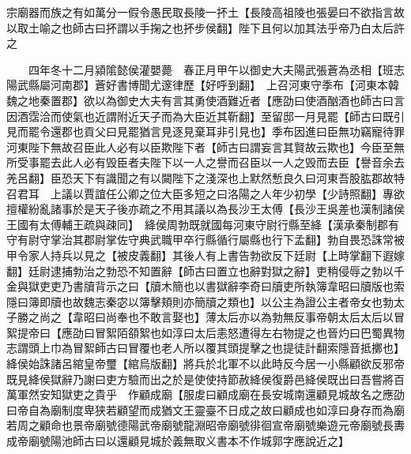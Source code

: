 宗廟器而族之有如萬分一假令愚民取長陵一抔土【長陵高祖陵也張晏曰不欲指言故以取土喻之也師古曰抔謂以手掬之也抔步侯翻】陛下且何以加其法乎帝乃白太后許之

　　四年冬十二月潁隂懿侯灌嬰薨　春正月甲午以御史大夫陽武張蒼為丞相【班志陽武縣屬河南郡】蒼好書博聞尤邃律歷【好呼到翻】　上召河東守季布【河東本韓魏之地秦置郡】欲以為御史大夫有言其勇使酒難近者【應劭曰使酒酗酒也師古曰言因酒霑洽而使氣也近謂附近天子而為大臣近其靳翻】至留邸一月見罷【師古曰既引見而罷令還郡也貢父曰見罷猶言見逐見棄耳非引見也】季布因進曰臣無功竊寵待罪河東陛下無故召臣此人必有以臣欺陛下者【師古曰謂妄言其賢故云欺也】今臣至無所受事罷去此人必有毁臣者夫陛下以一人之譽而召臣以一人之毁而去臣【譽音余去羌呂翻】臣恐天下有識聞之有以闚陛下之淺深也上默然慙良久曰河東吾股肱郡故特召君耳　上議以賈誼任公卿之位大臣多短之曰洛陽之人年少初學【少詩照翻】專欲擅權紛亂諸事於是天子後亦疏之不用其議以為長沙王太傅【長沙王吳差也漢制諸侯王國有太傅輔王疏與疎同】　絳侯周勃既就國每河東守尉行縣至絳【漢承秦制郡有守有尉守掌治其郡尉掌佐守典武職甲卒行縣循行屬縣也行下孟翻】勃自畏恐誅常被甲令家人持兵以見之【被皮義翻】其後人有上書告勃欲反下廷尉【上時掌翻下遐嫁翻】廷尉逮捕勃治之勃恐不知置辭【師古曰置立也辭對獄之辭】吏稍侵辱之勃以千金與獄吏吏乃書牘背示之曰【牘木簡也以書獄辭李奇曰牘吏所執簿韋昭曰牘版也索隱曰簿即牘也故魏志秦宓以簿擊頬則亦簡牘之類也】以公主為證公主者帝女也勃太子勝之尚之【韋昭曰尚奉也不敢言娶也】薄太后亦以為勃無反事帝朝太后太后以冒絮提帝曰【應劭曰冒絮陌頟絮也如淳曰太后恚怒遭得左右物提之也晉灼曰巴蜀異物志謂頭上巾為冒絮師古曰冒覆也老人所以覆其頭提擊之也提徒計翻索隱音抵擲也】絳侯始誅諸呂綰皇帝璽【綰烏版翻】將兵於北軍不以此時反今居一小縣顧欲反邪帝既見絳侯獄辭乃謝曰吏方驗而出之於是使使持節赦絳侯復爵邑絳侯既出曰吾嘗將百萬軍然安知獄吏之貴乎　作顧成廟【服䖍曰顧成廟在長安城南還顧見城故名之應劭曰帝自為廟制度卑狭若顧望而成猶文王靈臺不日成之故曰顧成也如淳曰身存而為廟若周之顧命也景帝廟號德陽武帝廟號龍淵昭帝廟號徘徊宣帝廟號樂遊元帝廟號長夀成帝廟號陽池師古曰以還顧見城於義無取义書本不作城郭字應說近之】

